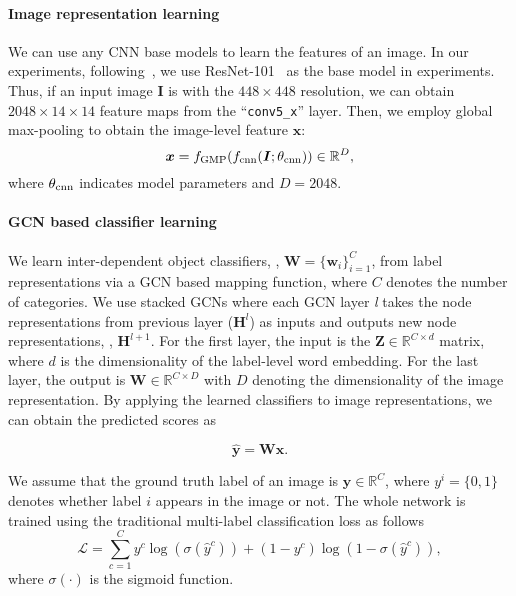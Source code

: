 \documentclass[10pt,twocolumn,letterpaper]{article}
\begin{document}
\paragraph{Image representation learning} We can use any CNN base models to learn the features of an image. In our experiments, following~\cite{srn,order,ml-zsl,multi_evidence}, we use ResNet-101~\cite{resnet} as the base model in experiments. Thus, if an input image $\bm{I}$ is with the $448 \times 448$ resolution, we can obtain $2048 \times 14 \times 14$ feature maps from the ``\texttt{conv5\_x}'' layer. Then, we employ global max-pooling to obtain the image-level feature $\bm{x}$:
\begin{equation}
	\bm{x} = f_{\rm GMP}(f_{\rm cnn} (\bm{I}; \theta_{\rm cnn})) \in \mathbb{R}^{D},
\end{equation}
where $\theta_{\rm cnn}$ indicates model parameters and $D=2048$.

\paragraph{GCN based classifier learning} We learn inter-dependent object classifiers, \ie, $\bm{W} = \{\bm{w}_{i}\}_{i=1}^{C}$, from label representations via a GCN based mapping function, where $C$ denotes the number of categories. We use stacked GCNs where each GCN layer \textit{l} takes the node representations from previous layer ($\bm{H}^{l}$) as inputs and outputs new node representations, \ie, $\bm{H}^{l+1}$. For the first layer, the input is the $\bm{Z} \in \mathbb{R}^{C \times d}$ matrix, where $d$ is the dimensionality of the label-level word embedding. For the last layer, the output is $\bm{W} \in \mathbb{R}^{C\times{D}}$ with $D$ denoting the dimensionality of the image representation. By applying the learned classifiers to image representations, we can obtain the predicted scores as

\begin{equation}
	\hat{\bm{y}} = \bm{W} \bm{x}.
\end{equation}

We assume that the ground truth label of an image is $\bm{y}\in\mathbb{R}^{C}$, where $y^i = \{0,1\}$ denotes whether label $i$ appears in the image or not. 
The whole network is trained using the traditional multi-label classification loss as follows
\begin{equation}
	\mathcal{L}= \sum_{c=1}^{C}y^{c}\log(\sigma(\hat{y}^{c})) + (1-y^{c})\log(1-\sigma(\hat{y}^{c})),
\end{equation}
where $\sigma(\cdot)$ is the sigmoid function.
\end{document}
